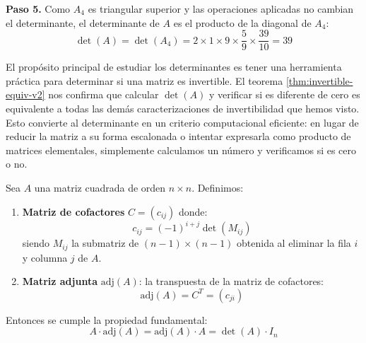 \begin{example}
\begin{myproof}
\textbf{Paso 5.} Como $A_4$ es triangular superior y las operaciones aplicadas no cambian el determinante, el determinante de $A$ es el producto de la diagonal de $A_4$:
\[
\boxed{\det(A)=\det(A_4)=2\times 1\times 9\times \frac{5}{9}\times \frac{39}{10}=39}
\]
\end{myproof}
\end{example}

\begin{rem}
El propósito principal de estudiar los determinantes es tener una herramienta práctica para determinar si una matriz es invertible. El teorema \ref{thm:invertible-equiv-v2} nos confirma que calcular $\det(A)$ y verificar si es diferente de cero es equivalente a todas las demás caracterizaciones de invertibilidad que hemos visto. Esto convierte al determinante en un criterio computacional eficiente: en lugar de reducir la matriz a su forma escalonada o intentar expresarla como producto de matrices elementales, simplemente calculamos un número y verificamos si es cero o no.
\end{rem}

\begin{theorem}\label{thm:adjunta}
Sea $A$ una matriz cuadrada de orden $n \times n$. Definimos:

\begin{enumerate}
    \item \textbf{Matriz de cofactores} $C = (c_{ij})$ donde: 
    \[
    c_{ij} = (-1)^{i+j} \det(M_{ij})
    \]
    siendo $M_{ij}$ la submatriz de $(n-1)\times(n-1)$ obtenida al eliminar la fila $i$ y columna $j$ de $A$.

    \item \textbf{Matriz adjunta} $\text{adj}(A)$: la transpuesta de la matriz de cofactores:
    \[
    \text{adj}(A) = C^T = (c_{ji})
    \]
\end{enumerate}

Entonces se cumple la propiedad fundamental:
\[
A \cdot \text{adj}(A) = \text{adj}(A) \cdot A = \det(A) \cdot I_n
\]
\end{theorem}

